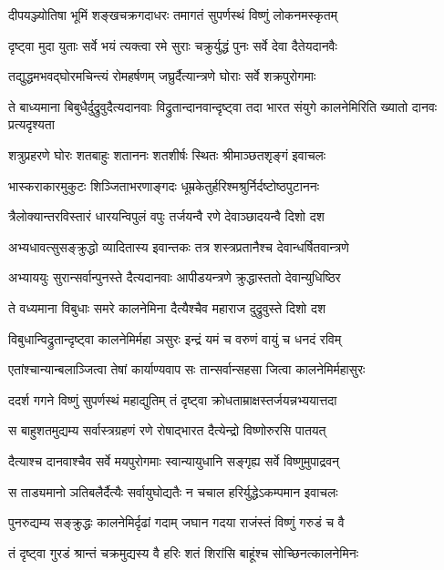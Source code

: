 \twolineshloka
{दीपयञ्ज्योतिषा भूमिं शङ्खचक्रगदाधरः}
{तमागतं सुपर्णस्थं विष्णुं लोकनमस्कृतम्}


\twolineshloka
{दृष्ट्वा मुदा युताः सर्वे भयं त्यक्त्वा रमे सुराः}
{चक्रुर्युद्धं पुनः सर्वे देवा दैतेयदानवैः}


\twolineshloka
{तद्युद्धमभवद्घोरमचिन्त्यं रोमहर्षणम्}
{जघ्रुर्दैत्यान्त्रणे घोराः सर्वे शक्रपुरोगमाः}


ते बाध्यमाना बिबुधैर्दुद्रुवुदैत्यदानवाः
\twolineshloka
{विद्रुतान्दानवान्दृष्ट्वा तदा भारत संयुगे}
{कालनेमिरिति ख्यातो दानवः प्रत्यदृश्यता}


\twolineshloka
{शत्रुप्रहरणे घोरः शतबाहुः शताननः}
{शतशीर्षः स्थितः श्रीमाञ्छतशृङ्गं इवाचलः}


\twolineshloka
{भास्कराकारमुकुटः शिञ्जिताभरणाङ्गदः}
{धूम्रकेतुर्हरिश्मश्रुर्निर्दष्टोष्ठपुटाननः}


\twolineshloka
{त्रैलोक्यान्तरविस्तारं धारयन्विपुलं वपुः}
{तर्जयन्वै रणे देवाञ्छादयन्वै दिशो दश}


\twolineshloka
{अभ्यधावत्सुसङ्क्रुद्धो व्यादितास्य इवान्तकः}
{तत्र शस्त्रप्रतानैश्च देवान्धर्षितवान्त्रणे}


\twolineshloka
{अभ्याययुः सुरान्सर्वान्पुनस्ते दैत्यदानवाः}
{आपीडयन्त्रणे क्रुद्धास्ततो देवान्युधिष्ठिर}


\twolineshloka
{ते वध्यमाना विबुधाः समरे कालनेमिना}
{दैत्यैश्चैव महाराज दुद्रुवुस्ते दिशो दश}


\threelineshloka
{विबुधान्विद्रुतान्दृष्ट्वा कालनेमिर्महा}
{ञसुरः}
{इन्द्रं यमं च वरुणं वायुं च धनदं रविम्}


\twolineshloka
{एतांश्चान्यान्बलाञ्जित्वा तेषां कार्याण्यवाप सः}
{तान्सर्वान्सहसा जित्वा कालनेमिर्महासुरः}


\twolineshloka
{ददर्श गगने विष्णुं सुपर्णस्थं महाद्युतिम्}
{तं दृष्ट्वा क्रोधताम्राक्षस्तर्जयन्नभ्ययात्तदा}


\twolineshloka
{स बाहुशतमुद्यम्य सर्वास्त्रग्रहणं रणे}
{रोषाद्भारत दैत्येन्द्रो विष्णोरुरसि पातयत्}


\twolineshloka
{दैत्याश्च दानवाश्चैव सर्वे मयपुरोगमाः}
{स्वान्यायुधानि सङ्गृह्य सर्वे विष्णुमुपाद्रवन्}


\threelineshloka
{स ताड्यमानो}
{ञतिबलैर्दैत्यैः सर्वायुघोद्यतैः}
{न चचाल हरिर्युद्धेऽकम्पमान इवाचलः}


\twolineshloka
{पुनरुद्यम्य सङ्क्रुद्धः कालनेमिर्दृढां गदाम्}
{जघान गदया राजंस्तं विष्णुं गरुडं च वै}


\twolineshloka
{तं दृष्ट्वा गुरडं श्रान्तं चक्रमुद्यस्य वै हरिः}
{शतं शिरांसि बाहूंश्च सोच्छिनत्कालनेमिनः}



